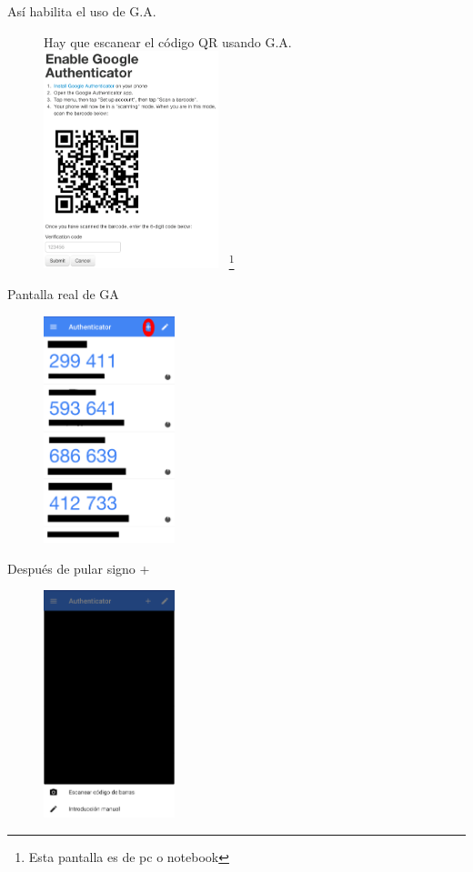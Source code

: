 \documentclass[11pt]{beamer}
\let\oldfootnote\footnote
\renewcommand\footnote[1][]{\oldfootnote[frame,#1]}
\begin{document}
\begin{frame}{As\'i habilita el uso de G.A.}
  \begin{figure}{Hay que escanear el c\'odigo QR usando G.A.}
    \includegraphics[width=2in]{images/enable-authenticator.png}
	~\footnote{Esta pantalla es de pc o notebook}
  \end{figure}
\end{frame}
\begin{frame}{Pantalla real de GA}
  \begin{figure}
    \includegraphics[width=1.5in]{images/pantalla-ga.png}
  \end{figure}
\end{frame}
\begin{frame}{Despu\'es de pular signo +}
  \begin{figure}
    \includegraphics[width=1.5in]{images/despuesmas.png}
  \end{figure}
\end{frame}
\end{document}
